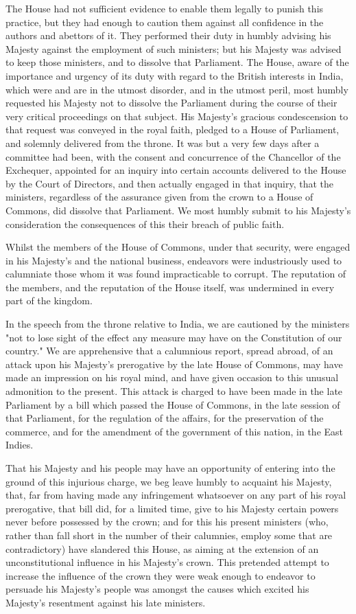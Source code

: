 The House had not sufficient evidence to enable them legally to punish this practice, but they had enough to caution them against all confidence in the authors and abettors of it. They performed their duty in humbly advising his Majesty against the employment of such ministers; but his Majesty was advised to keep those ministers, and to dissolve that Parliament. The House, aware of the importance and urgency of its duty with regard to the British interests in India, which were and are in the utmost disorder, and in the utmost peril, most humbly requested his Majesty not to dissolve the Parliament during the course of their very critical proceedings on that subject. His Majesty's gracious condescension to that request was conveyed in the royal faith, pledged to a House of Parliament, and solemnly delivered from the throne. It was but a very few days after a committee had been, with the consent and concurrence of the Chancellor of the Exchequer, appointed for an inquiry into certain accounts delivered to the House by the Court of Directors, and then actually engaged in that inquiry, that the ministers, regardless of the assurance given from the crown to a House of Commons, did dissolve that Parliament. We most humbly submit to his Majesty's consideration the consequences of this their breach of public faith.

Whilst the members of the House of Commons, under that security, were engaged in his Majesty's and the national business, endeavors were industriously used to calumniate those whom it was found impracticable to corrupt. The reputation of the members, and the reputation of the House itself, was undermined in every part of the kingdom.

In the speech from the throne relative to India, we are cautioned by the ministers "not to lose sight of the effect any measure may have on the Constitution of our country." We are apprehensive that a calumnious report, spread abroad, of an attack upon his Majesty's prerogative by the late House of Commons, may have made an impression on his royal mind, and have given occasion to this unusual admonition to the present. This attack is charged to have been made in the late Parliament by a bill which passed the House of Commons, in the late session of that Parliament, for the regulation of the affairs, for the preservation of the commerce, and for the amendment of the government of this nation, in the East Indies.

That his Majesty and his people may have an opportunity of entering into the ground of this injurious charge, we beg leave humbly to acquaint his Majesty, that, far from having made any infringement whatsoever on any part of his royal prerogative, that bill did, for a limited time, give to his Majesty certain powers never before possessed by the crown; and for this his present ministers (who, rather than fall short in the number of their calumnies, employ some that are contradictory) have slandered this House, as aiming at the extension of an unconstitutional influence in his Majesty's crown. This pretended attempt to increase the influence of the crown they were weak enough to endeavor to persuade his Majesty's people was amongst the causes which excited his Majesty's resentment against his late ministers.

